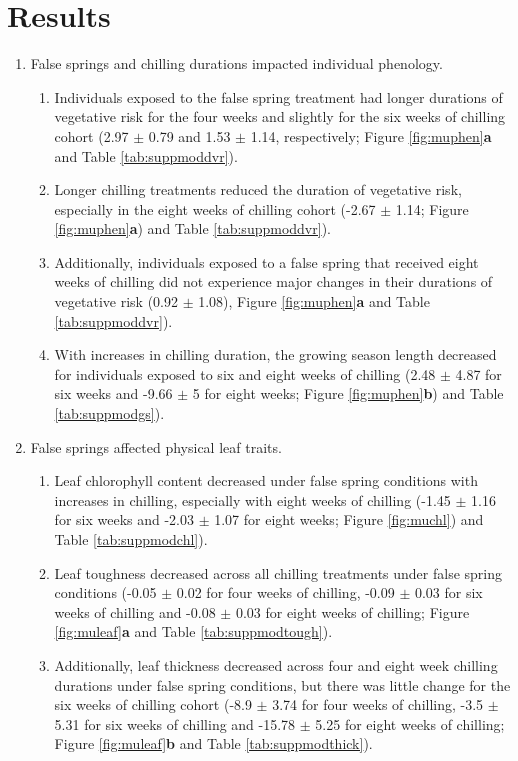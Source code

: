 \documentclass{article}\usepackage[]{graphicx}\usepackage[]{color}
\begin{document}
\section*{Results}
\begin{enumerate}
\item False springs and chilling durations impacted individual phenology. 
  \begin{enumerate}
  \item Individuals exposed to the false spring treatment had longer durations of vegetative risk for the four weeks and slightly for the six weeks of chilling cohort (2.97 $\pm$ 0.79 and 1.53 $\pm$ 1.14, respectively; Figure \ref{fig:muphen}\textbf{a} and Table \ref{tab:suppmoddvr}).
  \item Longer chilling treatments reduced the duration of vegetative risk, especially in the eight weeks of chilling cohort (-2.67 $\pm$ 1.14; Figure \ref{fig:muphen}\textbf{a}) and Table \ref{tab:suppmoddvr}).
  \item Additionally, individuals exposed to a false spring that received eight weeks of chilling did not experience major changes in their durations of vegetative risk (0.92 $\pm$ 1.08), Figure \ref{fig:muphen}\textbf{a} and Table \ref{tab:suppmoddvr}). 
  \item With increases in chilling duration, the growing season length decreased for individuals exposed to six and eight weeks of chilling (2.48 $\pm$ 4.87 for six weeks and -9.66 $\pm$ 5 for eight weeks; Figure \ref{fig:muphen}\textbf{b}) and Table \ref{tab:suppmodgs}).
  \end{enumerate}
  
\item False springs affected physical leaf traits.
  \begin{enumerate}
  \item Leaf chlorophyll content decreased under false spring conditions with increases in chilling, especially with eight weeks of chilling (-1.45 $\pm$ 1.16 for six weeks and -2.03 $\pm$ 1.07 for eight weeks; Figure \ref{fig:muchl}) and Table \ref{tab:suppmodchl}).
  \item Leaf toughness decreased across all chilling treatments under false spring conditions (-0.05 $\pm$ 0.02 for four weeks of chilling, -0.09 $\pm$ 0.03 for six weeks of chilling and -0.08 $\pm$ 0.03 for eight weeks of chilling; Figure \ref{fig:muleaf}\textbf{a} and Table \ref{tab:suppmodtough}).
  \item Additionally, leaf thickness decreased across four and eight week chilling durations under false spring conditions, but there was little change for the six weeks of chilling cohort (-8.9 $\pm$ 3.74 for four weeks of chilling, -3.5 $\pm$ 5.31 for six weeks of chilling and -15.78 $\pm$ 5.25 for eight weeks of chilling; Figure \ref{fig:muleaf}\textbf{b} and Table \ref{tab:suppmodthick}).
  \end{enumerate}
  

\end{enumerate}
\end{document}
